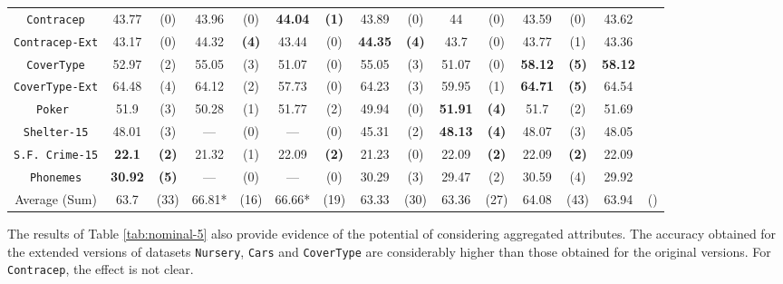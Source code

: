 \begin{sidewaystable*}[ph!]
\begin{tabular}{c|cc|cc|cc|cc|cc|cc|cc}
{\tt Contracep}     & 43.77    & (0)    & 43.96    & (0)    &{\bf44.04}&{\bf(1)}& 43.89    & (0)    & 44       & (0)    & 43.59    & (0)             & 43.62    &    \\
{\tt Contracep-Ext} & 43.17    & (0)    & 44.32    &{\bf(4)}& 43.44    & (0)    &{\bf44.35}&{\bf(4)}& 43.7     & (0)    & 43.77    & (1)             & 43.36    &    \\
{\tt CoverType}     & 52.97    & (2)    & 55.05    & (3)    & 51.07    & (0)    & 55.05    & (3)    & 51.07    & (0)    &{\bf58.12}&{\bf(5)}         &{\bf58.12}&    \\
{\tt CoverType-Ext} & 64.48    & (4)    & 64.12    & (2)    & 57.73    & (0)    & 64.23    & (3)    & 59.95    & (1)    &{\bf64.71}&{\bf(5)}         & 64.54    &    \\ 
{\tt Poker }        & 51.9     & (3)    & 50.28    & (1)    & 51.77    & (2)    & 49.94    & (0)    &{\bf51.91}&{\bf(4)}& 51.7     & (2)             & 51.69    &    \\
{\tt Shelter-15}    & 48.01    & (3)    & ---      & (0)    & ---      & (0)    & 45.31    & (2)    &{\bf48.13}&{\bf(4)}& 48.07    & (3)             & 48.05    &    \\   
{\tt S.F. Crime-15} &{\bf22.1} &{\bf(2)}& 21.32    & (1)    & 22.09    &{\bf(2)}& 21.23    & (0)    & 22.09    &{\bf(2)}& 22.09    &{\bf(2)}         & 22.09    &    \\
{\tt Phonemes}      &{\bf30.92}&{\bf(5)}& ---      & (0)    & ---      & (0)    & 30.29    & (3)    & 29.47    & (2)    & 30.59    & (4)             & 29.92    &    \\
\hline
Average (Sum)       &     63.7 & (33)   & 66.81*   & (16)   & 66.66*   & (19)   & 63.33    & (30)   & 63.36    & (27)   & 64.08    & (43)            & 63.94    & ()

\end{tabular}
\caption{Average accuracy and statistical tests  for  decision trees 
with depth at most 5 using only nominal attributes. The best accuracy for each dataset is bold-faced. Experiments that did not finish in reasonable time are considered statistically worse than the others. These criteria have a * mark besides their average accuracies, since they are calculated only on the experiments that finished.}
\label{tab:nominal-5}
\normalsize
\end{sidewaystable*}


The results of  Table \ref{tab:nominal-5} also
provide evidence of  the potential
of considering aggregated attributes. 
The accuracy obtained for the extended versions of datasets
{\tt Nursery}, {\tt Cars} and {\tt CoverType} are considerably higher than those obtained for 
the original versions. For {\tt Contracep}, the effect is not clear.

